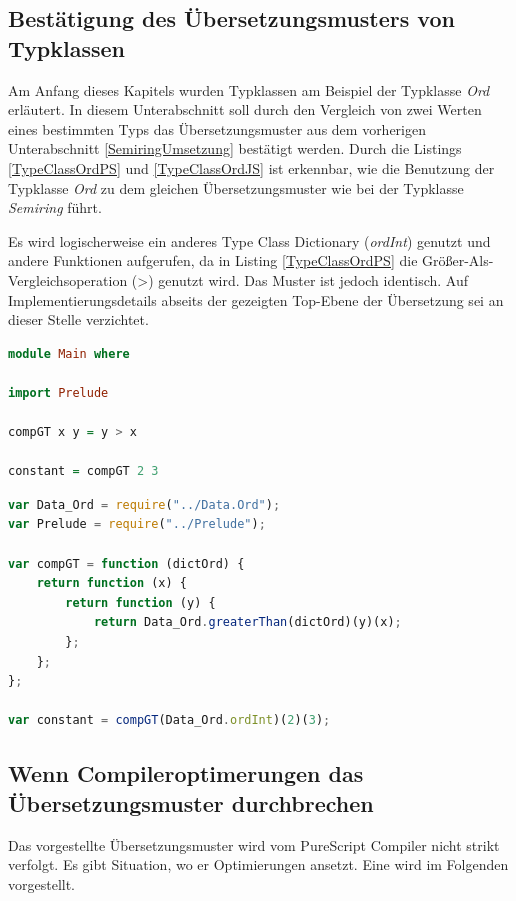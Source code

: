 \documentclass[
12pt,
ngerman,
oneside]
{scrbook} %
\begin{document}
\subsection{Bestätigung des Übersetzungsmusters von Typklassen}
Am Anfang dieses Kapitels wurden Typklassen am Beispiel der Typklasse \emph{Ord} erläutert. In diesem Unterabschnitt soll durch den Vergleich von zwei Werten eines bestimmten Typs das Übersetzungsmuster aus dem vorherigen Unterabschnitt \ref{SemiringUmsetzung} bestätigt werden. Durch die Listings \ref{TypeClassOrdPS} und \ref{TypeClassOrdJS} ist erkennbar, wie die Benutzung der Typklasse \emph{Ord} zu dem gleichen Übersetzungsmuster wie bei der Typklasse \emph{Semiring} führt.

Es wird logischerweise ein anderes Type Class Dictionary (\emph{ordInt}) genutzt und andere Funktionen aufgerufen, da in Listing \ref{TypeClassOrdPS} die Größer-Als-Vergleichsoperation (>) genutzt wird. Das Muster ist jedoch identisch. Auf Implementierungsdetails abseits der gezeigten Top-Ebene der Übersetzung sei an dieser Stelle verzichtet.

\begin{lstlisting}[language=purescript, style=numbered-and-boxed, caption=Beispiel mit Typklasse Ord in PureScript, label=TypeClassOrdPS]
module Main where

import Prelude

compGT x y = y > x

constant = compGT 2 3
\end{lstlisting}

\begin{lstlisting}[language=javascript, style=numbered-and-boxed, caption= Übersetzung nach JavaScript, label=TypeClassOrdJS]
var Data_Ord = require("../Data.Ord");
var Prelude = require("../Prelude");

var compGT = function (dictOrd) {
	return function (x) {
		return function (y) {
			return Data_Ord.greaterThan(dictOrd)(y)(x);
		};
	};
};

var constant = compGT(Data_Ord.ordInt)(2)(3);
\end{lstlisting}

\subsection{Wenn Compileroptimerungen das Übersetzungsmuster durchbrechen}
Das vorgestellte Übersetzungsmuster wird vom PureScript Compiler nicht strikt verfolgt. Es gibt Situation, wo er Optimierungen ansetzt. Eine wird im Folgenden vorgestellt. 
\end{document}
